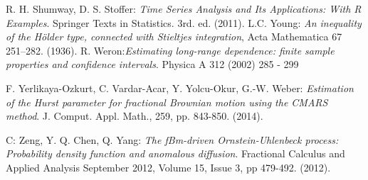 \documentclass[smallextended]{svjour3}
\begin{document}
\begin{thebibliography}{99}
    
     R. H. Shumway, D. S. Stoffer: {\it Time Series Analysis and 
    Its Applications: With R Examples}.
    Springer Texts in Statistics. 3rd. ed. (2011).
      L.C. Young: {\it An inequality of the H\"older type, 
    connected with Stieltjes integration}, Acta Mathematica 67
    251–282. (1936).
     R. Weron:{\it Estimating long-range dependence: finite sample 
    properties and confidence intervals}.
    Physica A 312 (2002) 285 - 299
    
     F. Yerlikaya-Ozkurt, C. Vardar-Acar, Y. Yolcu-Okur, G.-W. 
    Weber:
    {\it Estimation of the Hurst parameter for fractional Brownian motion using 
    the CMARS method}.
    J. Comput. Appl. Math., 259, pp. 843-850.  (2014).
    
     C: Zeng, Y. Q. Chen, Q. Yang: {\it The fBm-driven 
    Ornstein-Uhlenbeck process: Probability density function and
        anomalous diffusion}. Fractional Calculus and Applied Analysis 
        September 2012, Volume 15, Issue 3, pp 479-492. (2012).
    
    
\end{thebibliography}
\end{document}
